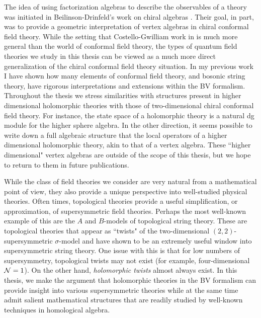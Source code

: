 The idea of using factorization algebras to describe the observables of a theory was initiated in Beilinson-Drinfeld's work on chiral algebras \cite{BD}. 
Their goal, in part, was to provide a geometric interpretation of vertex algebras in chiral conformal field theory. 
While the setting that Costello-Gwilliam work in is much more general than the world of conformal field theory, the types of quantum field theories we study in this thesis can be viewed as a much more direct generalization of the chiral conformal field theory situation. 
In my previous work \cite{BWVir, GGW, GWstring, GWsigma} I have shown how many elements of conformal field theory, and bosonic string theory, have rigorous interpretations and extensions within the BV formalism. 
Throughout the thesis we stress similarities with structures present in higher dimensional holomorphic theories with those of two-dimensional chiral conformal field theory. 
For instance, the state space of a holomorphic theory is a natural dg module for the higher sphere algebra.   
In the other direction, it seems possible to write down a full algebraic structure that the local operators of a higher dimensional holomorphic theory, akin to that of a vertex algebra. 
These ``higher dimensional" vertex algebras are outside of the scope of this thesis, but we hope to return to them in future publications. 

While the class of field theories we consider are very natural from a mathematical point of view, they also provide a unique perspective into well-studied physical theories. 
Often times, topological theories provide a useful simplification, or approximation, of supersymmetric field theories. 
Perhaps the most well-known example of this are the $A$ and $B$-models of topological string theory.
These are topological theories that appear as ``twists" of the two-dimensional $(2,2)$-supersymmetric $\sigma$-model and have shown to be an extremely useful window into supersymmetric string theory. 
One issue with this is that for low numbers of supersymmetry, topological twists may not exist (for example, four-dimensional $\mathcal N=1$).
On the other hand, {\em holomorphic twists} almost always exist. 
In this thesis, we make the argument that holomorphic theories in the BV formalism can provide insight into various supersymmetric theories while at the same time admit salient mathematical structures that are readily studied by well-known techniques in homological algebra.


